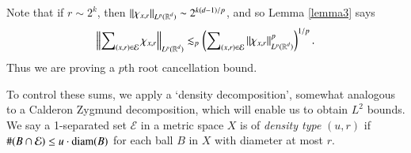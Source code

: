 \begin{remark}
    Note that if $r \sim 2^k$, then $\| \chi_{x,r} \|_{L^p(\operatorname{\mathbb{R}}^d)} \sim 2^{k(d-1)/p}$, and so Lemma \ref{lemma3} says
    \begin{equation}
      \left\| \sum\nolimits_{(x,r) \in \mathcal{E}} \chi_{x,r} \right\|_{L^p(\operatorname{\mathbb{R}}^d)} \lesssim_p \left( \sum\nolimits_{(x,r) \in \mathcal{E}} \| \chi_{x,r} \|_{L^p(\operatorname{\mathbb{R}}^d)}^p \right)^{1/p}.
    \end{equation}
    Thus we are proving a $p$th root cancellation bound.
\end{remark}

\begin{comment}
\begin{proof}[Proof of Lemma \ref{lemma2} from Lemma \ref{lemma3}]
    Let
    \[ F = \sum\nolimits_{(x,r) \in \mathcal{E}} \chi_{x,r} \]
    and then for $k \geq 1$, let
    \[ F_k = \sum\nolimits_{(x,r) \in \mathcal{E}_k} \chi_{x,r}. \]
    Then $F = \sum\nolimits_k F_k$, and. Applying a dyadic interpolation result (Lemma 2.2 of that paper), the bound
    \[ \| F_k \|_{L^r(\RR^d)} \lesssim 2^k (2^{k(d-r-1)} \#(\mathcal{E}_k)^{1/r}) \]
    which holds for $r$ to the left and right of $p$, can be interpolated to yield that
    \[ \| F \|_{L^p(\RR^d)} \lesssim \left( \sum\nolimits_k 2^{kp} ( 2^{k(d-r-1)} ) \right)^{1/p} \]


    Applying a dyadic interpolation result (Lemma 2.2 of the paper), Lemma \ref{lemma3} implies that
    \[ \left\| \sum\nolimits_{(x,r) \in \mathcal{E}} \chi_{x,r} \right\| \]

    \[ \left\| \sum\nolimits_{(x,r) \in \mathcal{E}} \chi_{x,r} \right\|_{L^p(\RR^d)} \lesssim \left( \sum 2^{kp} 2^{k(d-p-1)} \#(\mathcal{E}_k) \right)^{1/p} = \left( \sum 2^{k(d-1)} \#(\mathcal{E}_k) \right)^{1/p} \]
    This is a restricted strong type bound for Lemma \ref{lemma2}, which we can then interpolate.
\end{proof}
\end{comment}

To control these sums, we apply a `density decomposition', somewhat analogous to a Calderon Zygmund decomposition, which will enable us to obtain $L^2$ bounds. We say a 1-separated set $\mathcal{E}$ in a metric space $X$ is of \emph{density type} $(u,r)$ if $\#(B \cap \mathcal{E}) \leq u \cdot \operatorname{\text{diam}}(B)$ for each ball $B$ in $X$ with diameter at most $r$.

%
%

